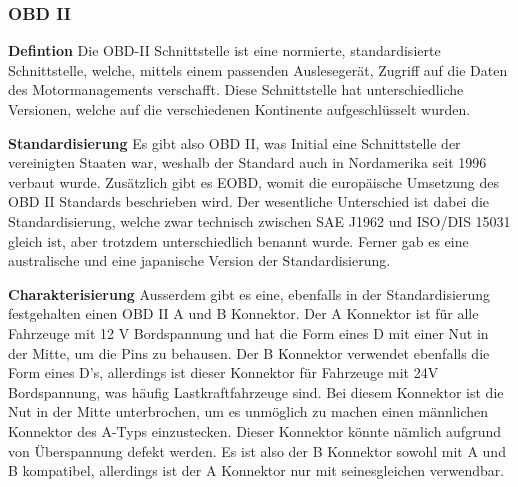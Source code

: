 \subsubsection{OBD II}

\textbf{Defintion\nextline}
Die OBD-II Schnittstelle ist eine normierte, standardisierte Schnittstelle, welche, mittels einem passenden Auslesegerät, Zugriff auf die Daten des Motormanagements verschafft. Diese Schnittstelle hat unterschiedliche Versionen, welche auf die verschiedenen Kontinente aufgeschlüsselt wurden. 

\textbf{Standardisierung\nextline}
Es gibt also OBD II, was Initial eine Schnittstelle der vereinigten Staaten war, weshalb der Standard auch in Nordamerika seit 1996 verbaut wurde. Zusätzlich gibt es EOBD, womit die europäische Umsetzung des OBD II Standards beschrieben wird.\cite{Directive.98/69/EC.EUParliament} Der wesentliche Unterschied ist dabei die Standardisierung, welche zwar technisch zwischen SAE J1962 und ISO/DIS 15031 gleich ist, aber trotzdem unterschiedlich benannt wurde. \cite{SAE.J1962} Ferner gab es eine australische \cite{AU.Motor.Vehicle.Standards.Act.1989} und eine japanische Version der Standardisierung.

\textbf{Charakterisierung\nextline}
Ausserdem gibt es eine, ebenfalls in der Standardisierung festgehalten einen OBD II A und B Konnektor. Der A Konnektor ist für alle Fahrzeuge mit 12 V Bordspannung und hat die Form eines D mit einer Nut in der Mitte, um die Pins zu behausen. Der B Konnektor verwendet ebenfalls die Form eines D's, allerdings ist dieser Konnektor für Fahrzeuge mit 24V Bordspannung, was häufig Lastkraftfahrzeuge sind. Bei diesem Konnektor ist die Nut in der Mitte unterbrochen, um es unmöglich zu machen einen männlichen Konnektor des A-Typs einzustecken. Dieser Konnektor könnte  nämlich aufgrund von Überspannung defekt werden. Es ist also der B Konnektor sowohl mit A und B kompatibel, allerdings ist der A Konnektor nur mit seinesgleichen verwendbar.

